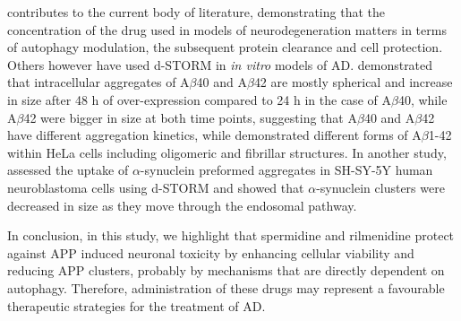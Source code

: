contributes to the current body of literature, demonstrating that the concentration of the drug used in models of neurodegeneration matters in terms of autophagy modulation, the subsequent protein clearance and cell protection. Others however have used d-STORM in \textit{in vitro} models of AD. \citet{Esbjorner2014} demonstrated that intracellular aggregates of A$\beta$40 and A$\beta$42 are mostly spherical and increase in size after 48 h of over-expression compared to 24 h in the case of A$\beta$40, while A$\beta$42 were bigger in size at both time points, suggesting that A$\beta$40 and A$\beta$42 have different aggregation kinetics, while \citet{KaminskiSchierle2011} demonstrated different forms of A$\beta$1-42 within HeLa cells including oligomeric and fibrillar structures. In another study, \citet{Apetri2016} assessed the uptake of $\alpha$-synuclein preformed aggregates in SH-SY-5Y human neuroblastoma cells using d-STORM and showed that $\alpha$-synuclein clusters were decreased in size as they move through the endosomal pathway. 

In conclusion, in this study, we highlight that spermidine and rilmenidine protect against APP induced neuronal toxicity by enhancing cellular viability and reducing APP clusters, probably by mechanisms that are directly dependent on autophagy. Therefore, administration of these drugs may represent a favourable therapeutic strategies for the treatment of AD. 




























